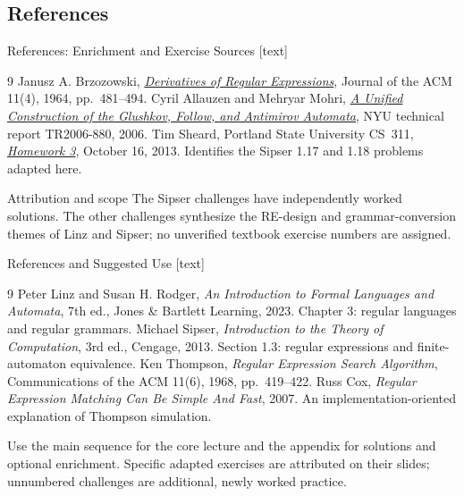 \documentclass[10pt]{beamer}
\begin{document}
\subsection{References}

\begin{frame}{References: Enrichment and Exercise Sources}
  \footnotesize
  [text]
  \begin{thebibliography}{9}
      Janusz A. Brzozowski,
      \href{https://doi.org/10.1145/321239.321249}
      {\emph{Derivatives of Regular Expressions}},
      Journal of the ACM 11(4), 1964, pp.\ 481--494.
      Cyril Allauzen and Mehryar Mohri,
      \href{https://cs.nyu.edu/media/publications/TR2006-880.pdf}
      {\emph{A Unified Construction of the Glushkov, Follow, and Antimirov
      Automata}}, NYU technical report TR2006-880, 2006.
      Tim Sheard, Portland State University CS~311,
      \href{https://web.cecs.pdx.edu/~sheard/course/CS311/Fall2013/homework/assign3.pdf}
      {\emph{Homework 3}}, October 16, 2013.
      Identifies the Sipser 1.17 and 1.18 problems adapted here.
  \end{thebibliography}
  \begin{block}{Attribution and scope}
    The Sipser challenges have independently worked solutions. The other
    challenges synthesize the RE-design and grammar-conversion themes of
    Linz and Sipser; no unverified textbook exercise numbers are assigned.
  \end{block}
\end{frame}

\begin{frame}{References and Suggested Use}
  \small
  [text]
  \begin{thebibliography}{9}
      Peter Linz and Susan H. Rodger,
      \emph{An Introduction to Formal Languages and Automata}, 7th ed.,
      Jones \& Bartlett Learning, 2023.
      Chapter 3: regular languages and regular grammars.
      Michael Sipser, \emph{Introduction to the Theory of Computation},
      3rd ed., Cengage, 2013. Section 1.3: regular expressions and
      finite-automaton equivalence.
      Ken Thompson, \emph{Regular Expression Search Algorithm},
      Communications of the ACM 11(6), 1968, pp.\ 419--422.
      Russ Cox, \emph{Regular Expression Matching Can Be Simple And Fast},
      2007. An implementation-oriented explanation of Thompson simulation.
  \end{thebibliography}
  Use the main sequence for the core lecture and the appendix for solutions
  and optional enrichment. Specific adapted exercises are attributed on
  their slides; unnumbered challenges are additional, newly worked practice.
\end{frame}
\end{document}
